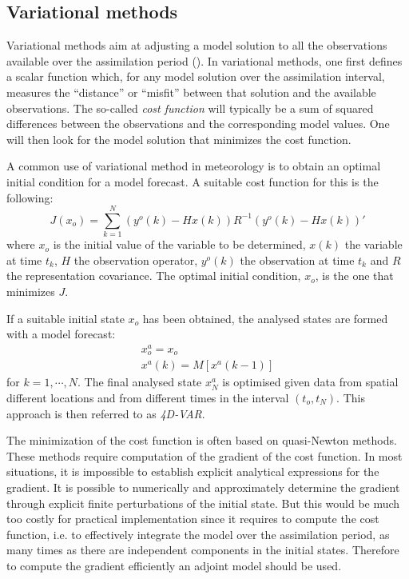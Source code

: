 \subsection{Variational methods}
Variational methods aim at adjusting a model solution to all the observations
available over the assimilation period (\cite{Talagrand1997}). In variational
methods, one first defines a scalar function which, for any model solution over
the assimilation interval, measures the ``distance'' or ``misfit'' between that
solution and the available observations. The so-called \emph{cost function}
will typically be a sum of squared differences between the observations and the
corresponding model values. One will then look for the model solution that
minimizes the cost function.

A common use of variational method in meteorology is to obtain an optimal
initial condition for a model forecast. A suitable cost function for this is
the following:
\begin{equation}\label{eq.costfunction1}
J(x_o) = \sum_{k=1}^N (y^o(k)-Hx(k))R^{-1}(y^o(k)-Hx(k))'
\end{equation}
where $x_o$ is the initial value of the variable to be determined, $x(k)$ the
variable at time $t_k$, $H$ the observation operator, $y^o(k)$ the observation
at time $t_k$ and $R$ the representation covariance. The optimal initial
condition, $x_o$, is the one that minimizes $J$.

If a suitable initial state $x_o$ has been obtained, the analysed states are
formed with a model forecast:
\begin{eqnarray}
x^a_o = x_o \\
x^a(k) = M[x^a(k-1)]
\end{eqnarray}
for $k=1, \cdots, N$. The final analysed state $x^a_N$ is optimised given data
from spatial different locations and from different times in the interval
$(t_o,t_N)$. This approach is then referred to as \emph{4D-VAR}.

The minimization of the cost function is often based on quasi-Newton methods.
These methods require computation of the gradient of the cost function. In most
situations, it is impossible to establish explicit analytical expressions for
the gradient. It is possible to numerically and approximately determine the
gradient through explicit finite perturbations of the initial state. But this
would be much too costly for practical implementation since it requires to
compute the cost function, i.e. to effectively integrate the model over the
assimilation period, as many times as there are independent components in the
initial states. Therefore to compute the gradient efficiently an adjoint model
should be used.

